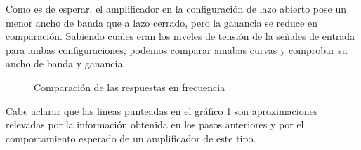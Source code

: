 Como es de esperar, el amplificador en la configuración de lazo abierto pose un menor ancho de banda que a lazo cerrado, pero la ganancia se reduce en comparación. Sabiendo cuales eran los niveles de tensión de la señales de entrada para ambas configuraciones, podemos comparar amabas curvas y comprobar su ancho de banda y ganancia.
\begin{figure}[H]
    \centering
    
    \caption{Comparación de las respuestas en frecuencia}
    \label{fig:RFcomp}
\end{figure}
Cabe aclarar que las lineas punteadas en el gráfico \ref{fig:RFcomp} son aproximaciones relevadas por la información obtenida en los pasos anteriores y por el comportamiento esperado de un amplificador de este tipo.